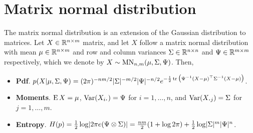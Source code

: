 \section{Matrix normal distribution}

The matrix normal distribution is an extension of the Gaussian distribution to matrices.
Let $X\in\bbR^{n \times m}$ matrix, and let $X$ follow a matrix normal distribution with mean $\mu\in\bbR^{n \times m}$ and row and column variances $\Sigma \in \bbR^{n \times n}$ and $\Psi \in \bbR^{m \times m}$ respectively, which we denote by $X\sim\MN_{n,m}(\mu,\Sigma,\Psi)$.
Then,
\begin{itemize}
  \item \textbf{Pdf}. $p(X|\mu,\Sigma,\Psi) = (2\pi)^{-nm/2}|\Sigma|^{-m/2}|\Psi|^{-n/2} e^{-\half \tr \big(\Psi^{-1}(X-\mu)^\top\Sigma^{-1}(X-\mu)\big)}$.
  \item \textbf{Moments}. $\E X=\mu$, $\Var(X_{i \bigcdot }) = \Psi$ for $i=1,\dots,n$, and $\Var(X_{\bigcdot j}) = \Sigma$ for $j=1,\dots,m$. 
  \item \textbf{Entropy}. $H(p) = \half \log \abs{2\pi e (\Psi \otimes \Sigma)} = \half[nm](1 + \log 2\pi) + \half\log\abs{\Sigma}^m\abs{\Psi}^n$.
\end{itemize}

